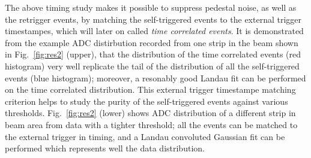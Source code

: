 \documentclass[conference]{IEEEtran}
\begin{document}
The above timing study makes it possible to suppress pedestal noise, as well as the retrigger events, by matching the self-triggered events to the external trigger timestampes, which will later on called \textit{time correlated events}.
It is demonstrated from the example ADC distirbution recorded from one strip in the beam shown in Fig.~\ref{fig:res2} (upper),
that the distribution of the time correlated events (red histogram) very well replicate the tail of the distribution of all the self-triggered events (blue histogram);
moreover, a resonably good Landau fit can be performed on the time correlated distribution.
This external trigger timestampe matching criterion helps to study the purity of the self-triggered events against various thresholds.
Fig.~\ref{fig:res2} (lower) shows ADC distribution of a different strip in beam area from data with a tighter threshold;
all the events can be matched to the external trigger in timing, and a Landau convoluted Gaussian fit can be performed which represents well the data distribution.

\end{document}
